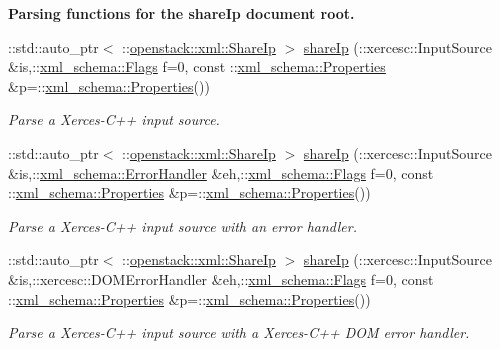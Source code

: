 \begin{Indent}{\bf Parsing functions for the shareIp document root.}
\begin{DoxyCompactItemize}
::std::auto\_\-ptr$<$ ::\hyperlink{classopenstack_1_1xml_1_1ShareIp}{openstack::xml::ShareIp} $>$ \hyperlink{namespaceopenstack_1_1xml_a957ab85fa8489f60ac264031a35a331e}{shareIp} (::xercesc::InputSource \&is,::\hyperlink{namespacexml__schema_affb4c227cbd9aa7453dd1dc5a1401943}{xml\_\-schema::Flags} f=0, const ::\hyperlink{namespacexml__schema_ad27ce19a7ee1d3b1064092648898f64c}{xml\_\-schema::Properties} \&p=::\hyperlink{namespacexml__schema_ad27ce19a7ee1d3b1064092648898f64c}{xml\_\-schema::Properties}())
\begin{DoxyCompactList}\small\item\em Parse a Xerces-\/C++ input source. \item\end{DoxyCompactList}\item 
::std::auto\_\-ptr$<$ ::\hyperlink{classopenstack_1_1xml_1_1ShareIp}{openstack::xml::ShareIp} $>$ \hyperlink{namespaceopenstack_1_1xml_a813a20547065bf84a965b02273354786}{shareIp} (::xercesc::InputSource \&is,::\hyperlink{namespacexml__schema_ab1c9361bfd3b404eaabf0c31eded79dc}{xml\_\-schema::ErrorHandler} \&eh,::\hyperlink{namespacexml__schema_affb4c227cbd9aa7453dd1dc5a1401943}{xml\_\-schema::Flags} f=0, const ::\hyperlink{namespacexml__schema_ad27ce19a7ee1d3b1064092648898f64c}{xml\_\-schema::Properties} \&p=::\hyperlink{namespacexml__schema_ad27ce19a7ee1d3b1064092648898f64c}{xml\_\-schema::Properties}())
\begin{DoxyCompactList}\small\item\em Parse a Xerces-\/C++ input source with an error handler. \item\end{DoxyCompactList}\item 
::std::auto\_\-ptr$<$ ::\hyperlink{classopenstack_1_1xml_1_1ShareIp}{openstack::xml::ShareIp} $>$ \hyperlink{namespaceopenstack_1_1xml_aaad5549b14fb0a3343639e6e43acdbf8}{shareIp} (::xercesc::InputSource \&is,::xercesc::DOMErrorHandler \&eh,::\hyperlink{namespacexml__schema_affb4c227cbd9aa7453dd1dc5a1401943}{xml\_\-schema::Flags} f=0, const ::\hyperlink{namespacexml__schema_ad27ce19a7ee1d3b1064092648898f64c}{xml\_\-schema::Properties} \&p=::\hyperlink{namespacexml__schema_ad27ce19a7ee1d3b1064092648898f64c}{xml\_\-schema::Properties}())
\begin{DoxyCompactList}\small\item\em Parse a Xerces-\/C++ input source with a Xerces-\/C++ DOM error handler. \item\end{DoxyCompactList}\item 

\end{DoxyCompactItemize}
\end{Indent}
